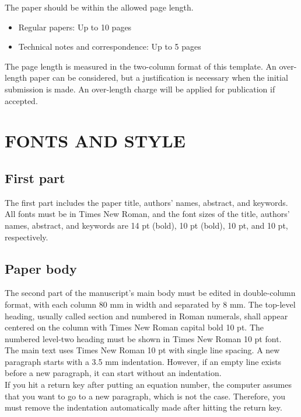 \documentclass{IJCAS}
\begin{document}
\noindent
The paper should be within the allowed page length.
\begin{itemize}\setlength{\itemindent}{0.5pc}
\item[1)] Regular papers: Up to 10 pages
\item[2)] Technical notes and correspondence: Up to 5 pages
\end{itemize}

\noindent
The page length is measured in the two-column format of this template. An over-length paper can be considered, but a justification is necessary when the initial submission is made. An over-length charge will be applied for publication if accepted.



\section{FONTS AND STYLE}

\subsection{First part}

The first part includes the paper title, authors' names, abstract, and keywords. All fonts must be in Times New Roman, and the font sizes of the title, authors' names, abstract, and keywords are 14 pt (bold), 10 pt (bold), 10 pt, and 10 pt, respectively.



\subsection{Paper body}

The second part of the manuscript's main body must be edited in double-column format, with each column 80 mm in width and separated by 8 mm. The top-level heading, usually called section and numbered in Roman numerals, shall appear centered on the column with Times New Roman capital bold 10 pt. The numbered level-two heading must be shown in Times New Roman 10 pt font.\\[0.75pc]
%
The main text uses Times New Roman 10 pt with single line spacing. A new paragraph starts with a 3.5 mm indentation. However, if an empty line exists before a new paragraph, it can start without an indentation. \\[0.75pc]
%
If you hit a return key after putting an equation number, the computer assumes that you want to go to a new paragraph, which is not the case. Therefore, you must remove the indentation automatically made after hitting the return key.
\end{document}

